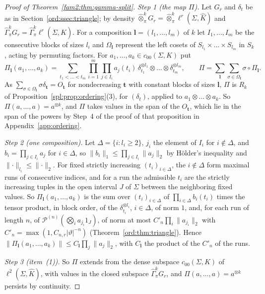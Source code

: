 \documentclass[11pt]{amsart}
\theoremstyle{definition}
\theoremstyle{remark}
\numberwithin{equation}{section}
\newcommand{\abs}[1]{\lvert #1\rvert}
\newcommand{\norm}[1]{\lVert #1\rVert}
\newcommand{\Kh}{\widehat K}
\theoremstyle{plain}
\theoremstyle{definition}
\theoremstyle{plain}
\newcommand{\hot}{\mathbin{\widehat\otimes}}
\newcommand{\hGamma}{\widehat\Gamma}
\newcommand{\cP}{\mathcal P}
\begin{document}
\begin{proof}[Proof of Theorem~\ref{fam2:thm:gamma-split}]
\emph{Step 1 (the map $\Pi$).} Let $G_r$ and $\delta_t$ be as in Section~\ref{ord:ssec:triangle}; by density
$\hot^k_\pi G_r=\hot^k_\pi\ell^r(\Sigma,\Kh)$ and $\hGamma^k_\pi G_r=\hGamma^k_\pi\ell^r(\Sigma,\Kh)$. For a composition
$\mathbf l=(l_1,\dots,l_m)$ of $k$ let $I_1,\dots,I_m$ be the consecutive blocks of sizes $l_i$ and $\Omega_{\mathbf l}$
represent the left cosets of $S_{l_1}\times\dots\times S_{l_m}$ in $S_k$, acting by permuting factors. For
$a_1,\dots,a_k\in c_{00}(\Sigma,K)$ put
\[\Pi_{\mathbf l}(a_1,\dots,a_k)=\sum_{t_1<\dots<t_m}\prod_{i=1}^m\prod_{j\in I_i}a_j(t_i)\,\delta_{t_1}^{\otimes l_1}
\otimes\dots\otimes\delta_{t_m}^{\otimes l_m},\qquad\Pi=\sum_{\mathbf l}\sum_{\sigma\in\Omega_{\mathbf l}}\sigma\circ
\Pi_{\mathbf l}.\]
As $\sum_{\sigma\in\Omega_{\mathbf l}}\sigma\delta_{\mathbf t}=O_{\mathbf t}$ for nondecreasing $\mathbf t$ with constant
blocks of sizes $\mathbf l$, $\Pi$ is $R_k$ of Proposition~\ref{spl:prop:ordering}(3), for $(\delta_t)$, applied to
$a_1\otimes\dots\otimes a_k$. So $\Pi(a,\dots,a)=a^{\otimes k}$, and $\Pi$ takes values in the span of the $O_{\mathbf t}$,
which lie in the span of the powers by Step~4 of the proof of that proposition in Appendix~\ref{app:ordering}.

\emph{Step 2 (one composition).} Let $\Delta=\{i:l_i\ge2\}$, $j_i$ the element of $I_i$ for $i\notin\Delta$, and
$b_i=\prod_{j\in I_i}a_j$ for $i\in\Delta$, so $\norm{b_i}_1\le\prod_{j\in I_i}\norm{a_j}_2$ by H\"older's inequality and
$\norm\cdot_{l_i}\le\norm\cdot_2$. For fixed strictly increasing $(t_i)_{i\in\Delta}$, the $i\notin\Delta$ form maximal runs
of consecutive indices, and for a run the admissible $t_i$ are the strictly increasing tuples in the open interval $J$ of
$\Sigma$ between the neighboring fixed values. So $\Pi_{\mathbf l}(a_1,\dots,a_k)$ is the sum over $(t_i)_{i\in\Delta}$ of
$\prod_{i\in\Delta}b_i(t_i)$ times the tensor product, in block order, of the $\delta_{t_i}^{\otimes l_i}$, $i\in\Delta$, of
norm $1$, and, for each run of length $n$, of $\cP^{(n)}(\bigotimes_i
a_{j_i}1_J)$, of norm at most $C'_n\prod_i\norm{a_{j_i}}_2$ with $C'_n=\max(1,C_{n,r}\abs\vartheta^{-n})$
(Theorem~\ref{ord:thm:triangle}). Hence $\norm{\Pi_{\mathbf l}(a_1,\dots,a_k)}\le C_{\mathbf l}\prod_j\norm{a_j}_2$, with
$C_{\mathbf l}$ the product of the $C'_n$ of the runs.

\emph{Step 3 (item~(1)).} So $\Pi$ extends from the dense subspace $c_{00}(\Sigma,K)$ of $\ell^2(\Sigma,\Kh)$, with values
in the closed subspace $\hGamma^k_\pi G_r$, and $\Pi(a,\dots,a)=a^{\otimes k}$ persists by continuity.


\end{proof}
\end{document}
